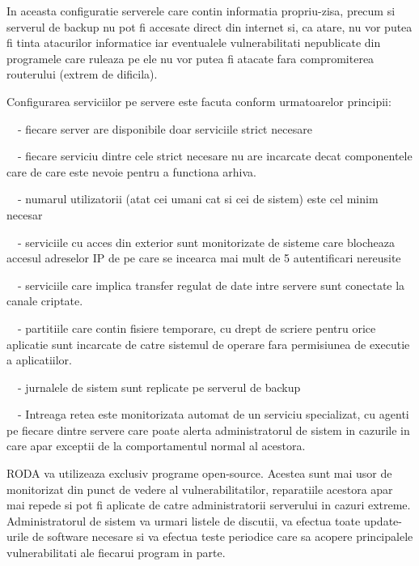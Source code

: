 {\sffamily\color{black}
In aceasta configuratie serverele care contin informatia propriu-zisa, precum si serverul de backup nu pot fi accesate
direct din internet si, ca atare, nu vor putea fi tinta atacurilor informatice iar eventualele vulnerabilitati
nepublicate din programele care ruleaza pe ele nu vor putea fi atacate fara compromiterea routerului (extrem de
dificila).}


\bigskip

{\sffamily\color{black}
Configurarea serviciilor pe servere este facuta conform urmatoarelor principii:}

{\sffamily\color{black}
\ \ {}- fiecare server are disponibile doar serviciile strict necesare}

{\sffamily\color{black}
\ \ {}- fiecare serviciu dintre cele strict necesare nu are incarcate decat componentele care de care este nevoie pentru
a functiona arhiva.}

{\sffamily\color{black}
\ \ {}- numarul utilizatorii (atat cei umani cat si cei de sistem) este cel minim necesar}

{\sffamily\color{black}
\ \ {}- serviciile cu acces din exterior sunt monitorizate de sisteme care blocheaza accesul adreselor IP de pe care se
incearca mai mult de 5 autentificari nereusite}

{\sffamily\color{black}
\ \ {}- serviciile care implica transfer regulat de date intre servere sunt conectate la canale criptate.}

{\sffamily\color{black}
\ \ {}- partitiile care contin fisiere temporare, cu drept de scriere pentru orice aplicatie sunt incarcate de catre
sistemul de operare fara permisiunea de executie a aplicatiilor. }

{\sffamily\color{black}
\ \ {}- jurnalele de sistem sunt replicate pe serverul de backup}

{\sffamily\color{black}
\ \ {}- Intreaga retea este monitorizata automat de un serviciu specializat, cu agenti pe fiecare dintre servere care
poate alerta administratorul de sistem in cazurile in care apar exceptii de la comportamentul normal al acestora. }


\bigskip

{\sffamily\color{black}
RODA va utilizeaza exclusiv programe open-source. Acestea sunt mai usor de monitorizat din punct de vedere al
vulnerabilitatilor, reparatiile acestora apar mai repede si pot fi aplicate de catre administratorii serverului in
cazuri extreme. Administratorul de sistem va urmari listele de discutii, va efectua toate update-urile de software
necesare si va efectua teste periodice care sa acopere principalele vulnerabilitati ale fiecarui program in parte. }


